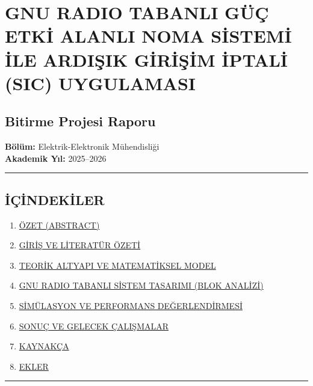 \documentclass[
]{IEEEtran}
\author{}
\date{}
\providecommand{\tightlist}{%
  \setlength{\itemsep}{0pt}\setlength{\parskip}{0pt}}
\begin{document}
\section{GNU RADIO TABANLI GÜÇ ETKİ ALANLI NOMA SİSTEMİ İLE ARDIŞIK
GİRİŞİM İPTALİ (SIC)
UYGULAMASI}\label{gnu-radio-tabanli-guxfcuxe7-etki-alanli-noma-sistemi-ile-ardiux15fik-giriux15fim-iptali-sic-uygulamasi}

\subsection{Bitirme Projesi Raporu}\label{bitirme-projesi-raporu}

\textbf{Bölüm:} Elektrik-Elektronik Mühendisliği\\
\textbf{Akademik Yıl:} 2025--2026

\begin{center}\rule{0.5\linewidth}{0.5pt}\end{center}

\subsection{İÇİNDEKİLER}\label{iuxe7indekiler}

\begin{enumerate}
\def\labelenumi{\arabic{enumi}.}
\tightlist
\item
  \hyperref[1-uxf6zet-abstract]{ÖZET (ABSTRACT)}
\item
  \hyperref[2-giriux15f-ve-literatuxfcr-uxf6zeti]{GİRİŞ VE LİTERATÜR
  ÖZETİ}
\item
  \hyperref[3-teorik-altyapux131-ve-matematiksel-model]{TEORİK ALTYAPI
  VE MATEMATİKSEL MODEL}
\item
  \hyperref[4-gnu-radio-tabanlux131-sistem-tasarux131mux131-blok-analizi]{GNU
  RADIO TABANLI SİSTEM TASARIMI (BLOK ANALİZİ)}
\item
  \hyperref[5-simuxfclasyon-ve-performans-deux11ferlendirmesi]{SİMÜLASYON
  VE PERFORMANS DEĞERLENDİRMESİ}
\item
  \hyperref[6-sonuuxe7-ve-gelecek-uxe7alux131ux15fmalar]{SONUÇ VE
  GELECEK ÇALIŞMALAR}
\item
  \hyperref[7-kaynakuxe7a]{KAYNAKÇA}
\item
  \hyperref[8-ekler]{EKLER}
\end{enumerate}

\begin{center}\rule{0.5\linewidth}{0.5pt}\end{center}
\end{document}
